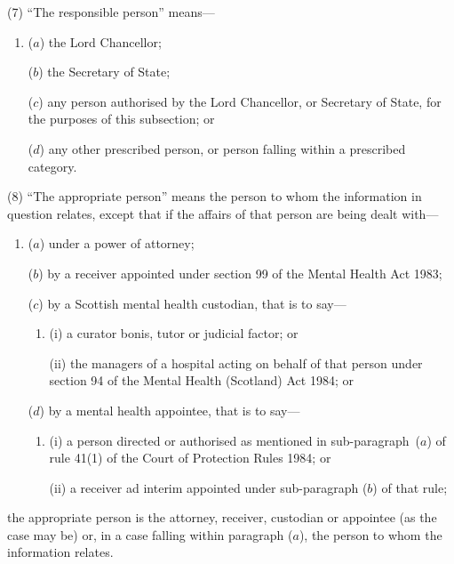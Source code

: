 \documentclass[12pt,a4paper]{article}
\begin{document}
(7) “The responsible person” means—
\begin{enumerate}\item[]
($a$) the Lord Chancellor;

($b$) the Secretary of State;

($c$) any person authorised by the Lord Chancellor, or Secretary of State, for the purposes of this subsection; or

($d$) any other prescribed person, or person falling within a prescribed category.
\end{enumerate}

(8) “The appropriate person” means the person to whom the information in question relates, except that if the affairs of that person are being dealt with—
\begin{enumerate}\item[]
($a$) under a power of attorney;

($b$) by a receiver appointed under section 99 of the Mental Health Act 1983;

($c$) by a Scottish mental health custodian, that is to say—
\begin{enumerate}\item[]
(i) a curator bonis, tutor or judicial factor; or

(ii) the managers of a hospital acting on behalf of that person under section 94 of the Mental Health (Scotland) Act 1984; or
\end{enumerate}

($d$) by a mental health appointee, that is to say—
\begin{enumerate}\item[]
(i) a person directed or authorised as mentioned in sub-\hspace{0pt}paragraph~($a$)  of rule 41(1)  of the Court of Protection Rules 1984; or

(ii) a receiver ad interim appointed under sub-paragraph ($b$)  of that rule;
\end{enumerate}
\end{enumerate}
the appropriate person is the attorney, receiver, custodian or appointee (as the case may be) or, in a case falling within paragraph ($a$), the person to whom the information relates.

\end{document}
